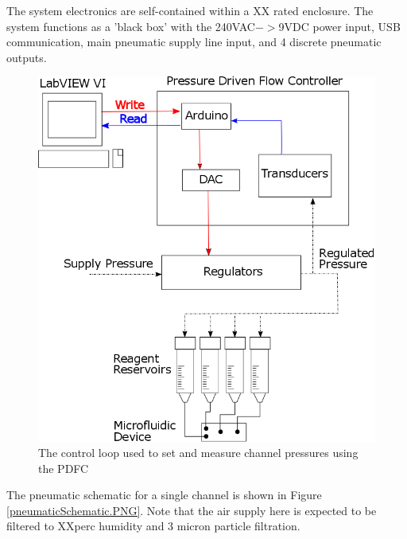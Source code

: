 The system electronics are self-contained within a XX rated enclosure. The system functions as a 'black box' with the 240VAC$->$9VDC power input, USB communication, main pneumatic supply line input, and 4 discrete pneumatic outputs.

\begin{figure}[H]
\centering 
\includegraphics[width=01.0\columnwidth]{systemOverview.PNG} 
\caption[Communications flowchart for operation of the PDFC]{The control loop used to set and measure channel pressures using the PDFC} 
\label{fig:systemOverview} 
\end{figure}

The pneumatic schematic for a single channel is shown in Figure \vref{pneumaticSchematic.PNG}. Note that the air supply here is expected to be filtered to XXperc humidity and 3 micron particle filtration. 

